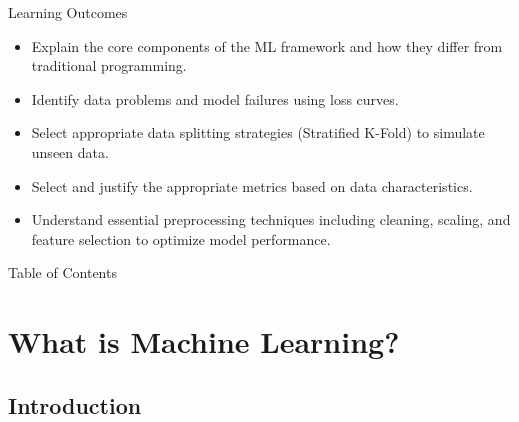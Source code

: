 

\begin{frame}{Learning Outcomes}
    \begin{itemize}
        \item Explain the core components of the ML framework and how they differ from traditional programming.

        \item Identify data problems and model failures using loss curves.
        
        \item Select appropriate data splitting strategies (Stratified K-Fold) to simulate unseen data.
        
        \item Select and justify the appropriate metrics based on data characteristics.
        
        \item Understand essential preprocessing techniques including cleaning, scaling, and feature selection to optimize model performance.
    \end{itemize}
\end{frame}

\begin{frame}{Table of Contents}
    \tableofcontents
\end{frame}


\section{What is Machine Learning?}

\subsection{Introduction}

